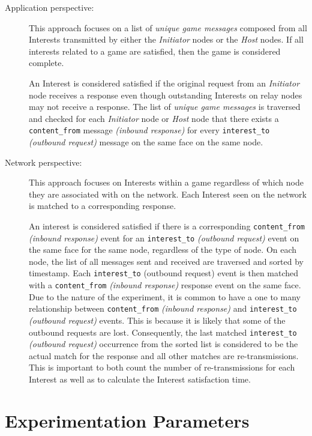 \documentclass[a4paper,12pt]{report}      %
\begin{document}
\begin{description}
\item[Application perspective:] This approach focuses on a list of \textsl{unique game messages} composed from
all Interests transmitted by either the \emph{Initiator} nodes or the \emph{Host} nodes. If all interests related to a
game are satisfied, then the game is considered complete.

An Interest is considered satisfied if the original request from an \emph{Initiator} node receives a 
response even though outstanding Interests on relay nodes may not receive a response. The list
of \textsl{unique game messages} is traversed and checked for each \emph{Initiator} node or \emph{Host} node that there
exists a \verb!content_from! message \textit{(inbound response)} for every 
\verb!interest_to! \textit{(outbound request)} message on the same face on the same node.

\item[Network perspective:] This approach focuses on Interests within a game regardless of which node they are
 associated with on the network. Each Interest seen on the network is matched to a
corresponding response.

An interest is considered satisfied if there is a corresponding \verb!content_from! \textit{(inbound response)} event
for an \verb!interest_to! \textit{(outbound request)} event on the same face for the same node, regardless of the type
of node. On each node, the list of all messages sent and received are traversed and sorted by timestamp.
Each \verb!interest_to! (outbound request) event is then matched with a \verb!content_from! \textit{(inbound response)}
response event on the same face. Due to the nature of the experiment, it is common to have a one to
many relationship between \verb!content_from! \textit{(inbound response)} and \verb!interest_to! \textit{(outbound request)} events. This is because it is likely that some of the outbound requests are lost. Consequently, the last matched
\verb!interest_to! \textit{(outbound request)} occurrence from the sorted list is considered to be the actual match for
the response and all other matches are re-transmissions. This is important to both count the number of
re-transmissions for each Interest as well as to calculate the Interest satisfaction time.
\end{description}

\section{Experimentation Parameters} 
\end{document}
